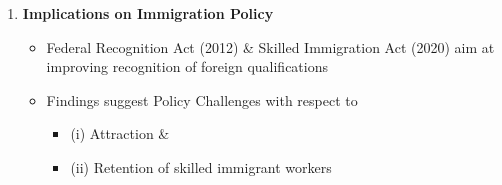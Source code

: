 \documentclass[10pt]{beamer}
\begin{document}
\begin{frame}
\begin{enumerate}
		\item \textbf{Implications on Immigration Policy}
		\begin{itemize}
			\item Federal Recognition Act (2012) \& Skilled Immigration Act (2020) aim at improving recognition of foreign qualifications
			\item Findings suggest Policy Challenges with respect to 
				\begin{itemize}
					\item (i) Attraction \&
					\item (ii) Retention of skilled immigrant workers
				\end{itemize}
			
			
		\end{itemize} 
		
		
	\end{enumerate}
	
	
	
\end{frame}


\end{document}
